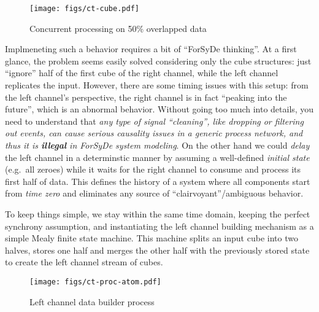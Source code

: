 \documentclass[
  a4paper,
]{article}
\begin{document}
\begin{figure}
\hypertarget{fig:cube-ct-cube}{%
\centering
\texttt{[image: figs/ct-cube.pdf]}
\caption{Concurrent processing on 50\% overlapped
data}\label{fig:cube-ct-cube}
}
\end{figure}

Implmeneting such a behavior requires a bit of ``ForSyDe thinking''. At
a first glance, the problem seems easily solved considering only the
cube structures: just ``ignore'' half of the first cube of the right
channel, while the left channel replicates the input. However, there are
some timing issues with this setup: from the left channel's perspective,
the right channel is in fact ``peaking into the future'', which is an
abnormal behavior. Without going too much into details, you need to
understand that \emph{any type of signal ``cleaning'', like dropping or
filtering out events, can cause serious causality issues in a generic
process network, and thus it is \textbf{illegal} in ForSyDe system
modeling}. On the other hand we could \emph{delay} the left channel in a
determinstic manner by assuming a well-defined \emph{initial state}
(e.g.~all zeroes) while it waits for the right channel to consume and
process its first half of data. This defines the history of a system
where all components start from \emph{time zero} and eliminates any
source of ``clairvoyant''/ambiguous behavior.

To keep things simple, we stay within the same time domain, keeping the
perfect synchrony assumption, and instantiating the left channel
building mechanism as a simple Mealy finite state machine. This machine
splits an input cube into two halves, stores one half and merges the
other half with the previously stored state to create the left channel
stream of cubes.

\begin{figure}
\hypertarget{fig:cube-ct-proc-atom}{%
\centering
\texttt{[image: figs/ct-proc-atom.pdf]}
\caption{Left channel data builder process}\label{fig:cube-ct-proc-atom}
}
\end{figure}
\end{document}
